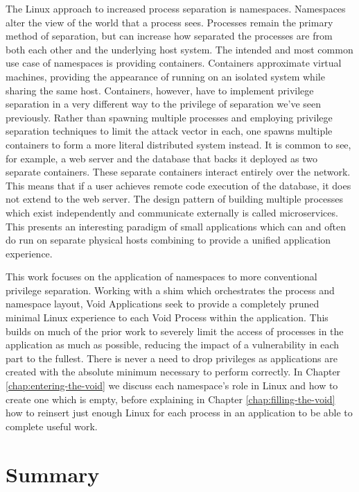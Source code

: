 \documentclass[a4paper,12pt,twoside,openright]{report}
\begin{document}
The Linux approach to increased process separation is namespaces. Namespaces alter the view of the world that a process sees. Processes remain the primary method of separation, but can increase how separated the processes are from both each other and the underlying host system. The intended and most common use case of namespaces is providing containers. Containers approximate virtual machines, providing the appearance of running on an isolated system while sharing the same host. Containers, however, have to implement privilege separation in a very different way to the privilege of separation we've seen previously. Rather than spawning multiple processes and employing privilege separation techniques to limit the attack vector in each, one spawns multiple containers to form a more literal distributed system instead. It is common to see, for example, a web server and the database that backs it deployed as two separate containers. These separate containers interact entirely over the network. This means that if a user achieves remote code execution of the database, it does not extend to the web server. The design pattern of building multiple processes which exist independently and communicate externally is called microservices. This presents an interesting paradigm of small applications which can and often do run on separate physical hosts combining to provide a unified application experience.

This work focuses on the application of namespaces to more conventional privilege separation. Working with a shim which orchestrates the process and namespace layout, Void Applications seek to provide a completely pruned minimal Linux experience to each Void Process within the application. This builds on much of the prior work to severely limit the access of processes in the application as much as possible, reducing the impact of a vulnerability in each part to the fullest. There is never a need to drop privileges as applications are created with the absolute minimum necessary to perform correctly. In Chapter \ref{chap:entering-the-void} we discuss each namespace's role in Linux and how to create one which is empty, before explaining in Chapter \ref{chap:filling-the-void} how to reinsert just enough Linux for each process in an application to be able to complete useful work.

\section{Summary}
\end{document}
